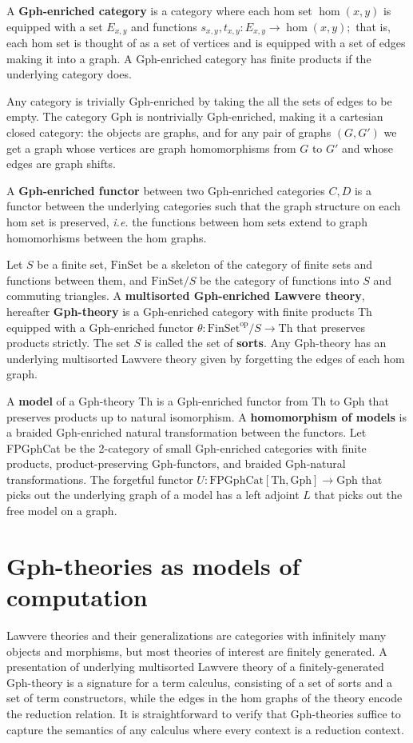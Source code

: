 \documentclass{llncs}
\newcommand{\maps}{\colon}
\newcommand{\Th}{\mathrm{Th}}
\newcommand{\Gph}{\mathrm{Gph}}
\newcommand{\FinSet}{\mathrm{FinSet}}
\newcommand{\FPGphCat}{\mathrm{FPGphCat}}
\newcommand{\op}{\mathrm{op}}
\begin{document}
A {\bf Gph-enriched category} is a category where each hom set $\hom(x,y)$ is equipped with a set $E_{x,y}$ and functions $s_{x,y}, t_{x,y}\maps E_{x,y} \to \hom(x,y);$ that is, each hom set is thought of as a set of vertices and is equipped with a set of edges making it into a graph.  A Gph-enriched category has finite products if the underlying category does.

Any category is trivially Gph-enriched by taking the all the sets of edges to be empty.  The category Gph is nontrivially Gph-enriched, making it a cartesian closed category: the objects are graphs, and for any pair of graphs $(G, G')$ we get a graph whose vertices are graph homomorphisms from $G$ to $G'$ and whose edges are graph shifts.

A {\bf Gph-enriched functor} between two Gph-enriched categories $C, D$ is a functor between the underlying categories such that the graph structure on each hom set is preserved, {\em i.e.} the functions between hom sets extend to graph homomorhisms between the hom graphs.

Let $S$ be a finite set, $\FinSet$ be a skeleton of the category of finite sets and functions between them, and $\FinSet/S$ be the category of functions into $S$ and commuting triangles.  A {\bf multisorted Gph-enriched Lawvere theory}, hereafter {\bf Gph-theory} is a Gph-enriched category with finite products Th equipped with a Gph-enriched functor $\theta\maps \FinSet^{\op}/S \to \Th$ that preserves products strictly.  The set $S$ is called the set of {\bf sorts}.  Any Gph-theory has an underlying multisorted Lawvere theory given by forgetting the edges of each hom graph.

A {\bf model} of a Gph-theory Th is a Gph-enriched functor from Th to Gph that preserves products up to natural isomorphism.  A {\bf homomorphism of models} is a braided Gph-enriched natural transformation between the functors.  Let FPGphCat be the 2-category of small Gph-enriched categories with finite products, product-preserving Gph-functors, and braided Gph-natural transformations.  The forgetful functor $U\maps \FPGphCat[\Th, \Gph] \to \Gph$ that picks out the underlying graph of a model has a left adjoint $L$ that picks out the free model on a graph.

\section{Gph-theories as models of computation}

Lawvere theories and their generalizations are categories with infinitely many objects and morphisms, but most theories of interest are finitely generated.  A presentation of underlying multisorted Lawvere theory of a finitely-generated Gph-theory is a signature for a term calculus, consisting of a set of sorts and a set of term constructors, while the edges in the hom graphs of the theory encode the reduction relation.  It is straightforward to verify that Gph-theories suffice to capture the semantics of any calculus where every context is a reduction context.
\end{document}
